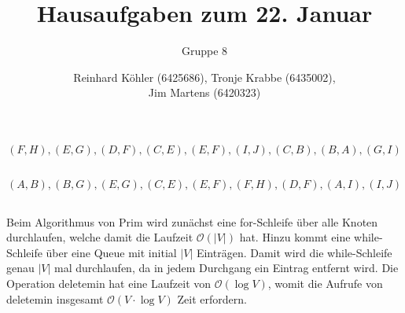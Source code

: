 \documentclass[10pt,a4paper,oneside,ngerman,numbers=noenddot]{scrartcl}
\begin{document}
\author{Reinhard Köhler (6425686), Tronje Krabbe (6435002), \\
Jim Martens (6420323)}
\title{Hausaufgaben zum 22. Januar}
\subtitle{Gruppe 8}
\maketitle

\section{} %
	\subsection{} %
		\[
			(F, H), (E, G), (D, F), (C, E), (E, F), (I, J), (C, B), (B, A), (G, I)
		\]
	\subsection{} %
	\subsection{} %
		\[
			(A, B), (B, G), (E, G), (C, E), (E, F), (F, H), (D, F), (A, I), (I, J)
		\]
	\subsection{} %
		Beim Algorithmus von Prim wird zunächst eine for-Schleife über alle Knoten durchlaufen, welche damit die Laufzeit $\mathcal{O}(|V|)$ hat. Hinzu kommt eine while-Schleife über eine Queue mit initial $|V|$ Einträgen. Damit wird die while-Schleife genau $|V|$ mal durchlaufen, da in jedem Durchgang ein Eintrag entfernt wird. Die Operation deletemin hat eine Laufzeit von $\mathcal{O}(\log V)$, womit die Aufrufe von deletemin insgesamt $\mathcal{O}(V \cdot \log V)$ Zeit erfordern.
		
\end{document}
